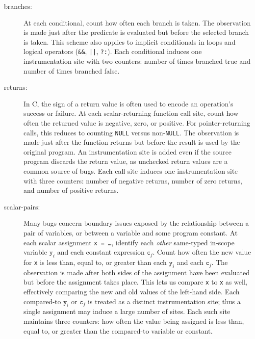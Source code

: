 \documentclass{sig-alternate}
\begin{document}
\begin{description}
\item[branches:] At each conditional,
  count how often each branch is taken.  The observation is
  made just after the predicate is evaluated but before the selected
  branch is taken.  This scheme also applies to implicit conditionals
  in loops and logical operators (\texttt{\&\&}, \texttt{||},
  \texttt{?:}).  Each conditional induces one instrumentation site
  with two counters: number of times branched true and number of times
  branched false.

\item[returns:] In C, the
  sign of a return value is often used to encode an operation's success or failure.
  At each scalar-returning function call site, count how
  often the returned value is negative, zero, or positive.  For
  pointer-returning calls, this reduces to counting
  \texttt{NULL} versus non-\texttt{NULL}.  The observation is made
  just after the function returns but before the result is used by the
  original program.  An instrumentation site is added even if the
  source program discards the return value, as unchecked return
  values are a common source of bugs.  Each call site induces one
  instrumentation site with three counters: number of negative
  returns, number of zero returns, and number of positive returns.

\item[scalar-pairs:] Many bugs
  concern boundary issues exposed by the relationship between a pair
  of variables, or between a variable and some program constant.  At
  each scalar assignment \texttt{x = \dots}, identify each
  \emph{other} same-typed in-scope variable $\mathtt{y}_i$ and each
  constant expression $\mathtt{c}_j$.  Count how often the new value
  for \texttt{x} is less than, equal to, or greater than each
  $\mathtt{y}_i$ and each $\mathtt{c}_j$.  The observation is made
  after both sides of the assignment have been evaluated but
  before the assignment takes place.  This lets us compare
  \texttt{x} to \texttt{x} as well, effectively comparing the new and
  old values of the left-hand side.  Each compared-to $\mathtt{y}_i$
  or $\mathtt{c}_j$ is treated as a distinct instrumentation site;
  thus a single assignment may induce a large number of sites.  Each
  such site maintains three counters: how often the value being
  assigned is less than, equal to, or greater than the compared-to
  variable or constant.
\end{description}
\end{document}
